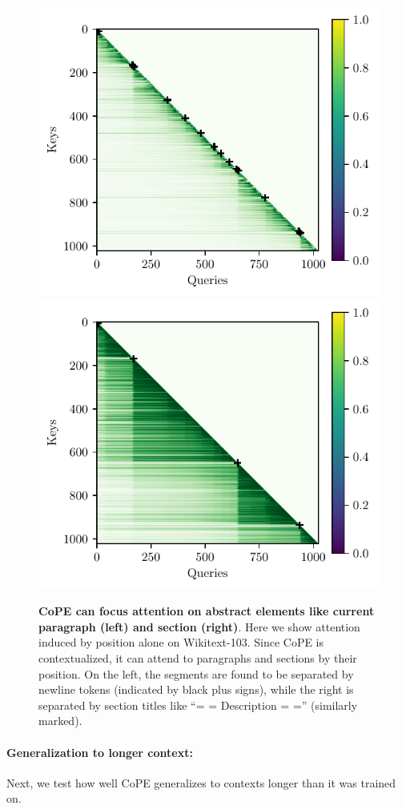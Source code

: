 \documentclass{article}
\newcommand{\ours}{CoPE\xspace}
\begin{document}
\begin{figure}[h]
  \centering
  \hfill
  \includegraphics[width=0.48\linewidth]{figs/attn_map_lay1_head9.pdf}
  \hfill
  \includegraphics[width=0.48\linewidth]{figs/attn_map_lay1_head0.pdf}
  \hfill
  \caption{{\bf \ours{} can focus attention on abstract 
  elements
  like current paragraph (left) and section (right)}. 
  Here we show attention induced by position alone on Wikitext-103. Since \ours{} is contextualized, it can attend to paragraphs and sections by their position. 
  On the left, the segments are found to be separated by newline tokens (indicated by black plus signs), while the right is separated by section titles like ``= = Description = ='' (similarly marked).}
  \label{fig:attention_maps}
\end{figure}



\paragraph{Generalization to longer context:}
Next, we test how well \ours{} generalizes to contexts  longer than  it was trained on.
\end{document}
